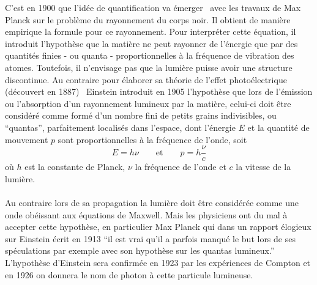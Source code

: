 C’est en 1900 que l’idée de quantification va émerger~\cite{wiki:mech-quantique} avec les travaux de Max Planck sur le problème du
rayonnement du corps noir.
Il obtient de manière empirique la formule pour ce rayonnement.
Pour interpréter cette équation, il introduit l’hypothèse que la matière ne peut rayonner de l’énergie que
par des quantités finies - ou quanta - proportionnelles à la fréquence de vibration des atomes.
Toutefois, il n’envisage pas que la lumière puisse avoir une structure discontinue.
Au contraire pour élaborer sa théorie de l’effet photoélectrique (découvert en 1887)~\cite{wiki:photoelectrique} Einstein introduit
en 1905 l’hypothèse que lors de l’émission ou l’absorption d’un rayonnement lumineux par la matière, celui-ci doit
être considéré comme formé d’un nombre fini de petits grains indivisibles, ou ``quantas'', parfaitement localisés dans
l’espace, dont l’énergie $E$ et la quantité de mouvement $p$ sont proportionnelles à la fréquence de l’onde, soit
\[
E = h \nu \qquad \text{et} \qquad p =  h \frac{\nu}{c}
\]
où $h$ est la constante de Planck, $\nu$ la fréquence de l’onde et $c$ la vitesse de la lumière.\\ \\
Au contraire lors de sa propagation la lumière doit être considérée comme une onde obéissant aux équations de
Maxwell.
Mais les physiciens ont du mal à accepter cette hypothèse, en particulier Max Planck qui dans un rapport
élogieux sur Einstein écrit en 1913 ``il est vrai qu’il a parfois manqué le but lors de ses spéculations par
exemple avec son hypothèse sur les quantas lumineux.''\\
L’hypothèse d’Einstein sera confirmée en 1923 par les expériences de Compton et en 1926 on donnera le nom de photon
à cette particule lumineuse.\\ \\

